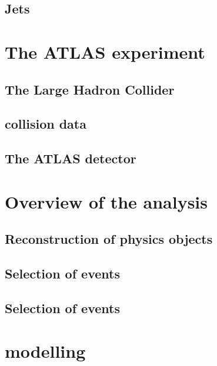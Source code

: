 \documentclass[hyper,linkcolor=blue]{mythesis}
\begin{document}
\begin{mainmatter}
    \section{Jets}
      \label{sec:jets}
      

  \chapter{The ATLAS experiment}
    \label{chap:experiment}
    
    \section{The Large Hadron Collider}
      \label{sec:lhc}
      
    \section{\pp collision data}
      \label{sec:dataset}
      
    \section{The ATLAS detector}
      \label{sec:atlas}
      
  
  \chapter{Overview of the \HWW analysis}
    \label{chap:selection}
    
    \section{Reconstruction of physics objects}
      \label{sec:objects}
      
    \section{Selection of \WW events}
      \label{sec:presel}
      
    \section{Selection of \HWW events}
      \label{sec:signalregions}
      

  \chapter{\ggH modelling}
    \label{chap:signal}
    

\end{mainmatter}
\end{document}
